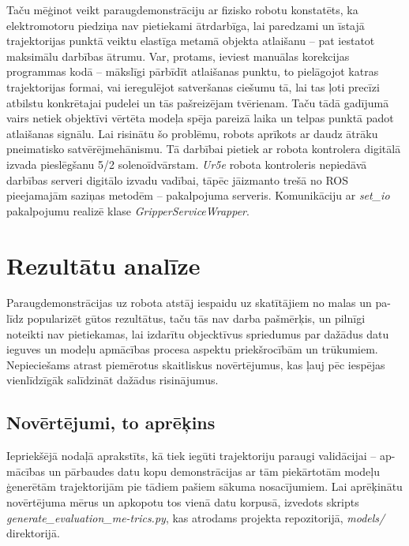 \documentclass[12pt, a4paper]{article}
\numberwithin{equation}{section} %
\begin{document}
Taču mēģinot veikt paraugdemonstrāciju ar fizisko robotu konstatēts, ka elektromotoru piedziņa nav pietiekami ātrdarbīga, lai paredzami un īstajā trajektorijas punktā veiktu elastīga metamā objekta atlaišanu -- pat iestatot maksimālu darbības ātrumu. Var, protams, ieviest manuālas korekcijas programmas kodā -- mākslīgi pārbīdīt atlaišanas punktu, to pielāgojot katras trajektorijas formai, vai ieregulējot satveršanas ciešumu tā, lai tas ļoti precīzi atbilstu konkrētajai pudelei un tās pašreizējam tvērienam. Taču tādā gadījumā vairs netiek objektīvi vērtēta modeļa spēja pareizā laika un telpas punktā padot atlaišanas signālu. Lai risinātu šo problēmu, robots aprīkots ar daudz ātrāku pneimatisko satvērējmehānismu. Tā darbībai pietiek ar robota kontrolera digitālā izvada pieslēgšanu 5/2 solenoīdvārstam. \textit{Ur5e} robota kontroleris nepiedāvā darbības serveri digitālo izvadu vadībai, tāpēc jāizmanto trešā no ROS pieejamajām saziņas metodēm -- pakalpojuma serveris. Komunikāciju ar \textit{set\_io} pakalpojumu realizē klase \textit{GripperServiceWrapper}.




%
%
%
%
%
%
%
%
%
%
%
%
%
%
%
%
%
%
%

\newpage
\section{Rezultātu analīze}

Paraugdemonstrācijas uz robota atstāj iespaidu uz skatītājiem no malas un pa-līdz popularizēt gūtos rezultātus, taču tās nav darba pašmērķis, un pilnīgi noteikti nav pietiekamas, lai izdarītu objecktīvus spriedumus par dažādus datu ieguves un modeļu apmācības procesa aspektu priekšrocībām un trūkumiem. Nepieciešams atrast piemērotus skaitliskus novērtējumus, kas ļauj pēc iespējas vienlīdzīgāk salīdzināt dažādus risinājumus.

\subsection{Novērtējumi, to aprēķins}

Iepriekšējā nodaļā aprakstīts, kā tiek iegūti trajektoriju paraugi validācijai -- ap-mācības un pārbaudes datu kopu demonstrācijas ar tām piekārtotām modeļu ģenerētām trajektorijām pie tādiem pašiem sākuma nosacījumiem. Lai aprēķinātu novērtējuma mērus un apkopotu tos vienā datu korpusā, izvedots skripts \textit{generate\_evaluation\_me-trics.py}, kas atrodams projekta repozitorijā, \textit{models/} direktorijā.
\end{document}
